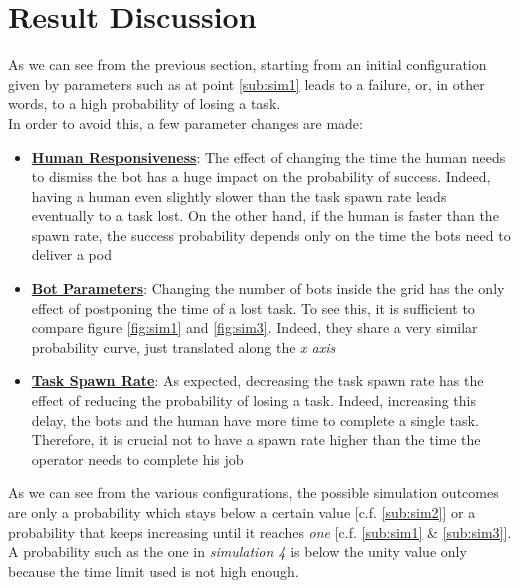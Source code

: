\documentclass{article}
\begin{document}
	\section{Result Discussion}
			As we can see from the previous section, starting from an initial configuration given by parameters such as at point \ref{sub:sim1} leads to a failure, or, in other words, to a high probability of losing a task.\\In order to avoid this, a few parameter changes are made:
			\begin{itemize}
				\item {\textbf{\underline{Human Responsiveness}}: The effect of changing the time the human needs to dismiss the bot has a huge impact on the probability of success. Indeed, having a human even slightly slower than the task spawn rate leads eventually to a task lost. On the other hand, if the human is faster than the spawn rate, the success probability depends only on the time the bots need to deliver a pod}
				\item {\textbf{\underline{Bot Parameters}}: Changing the number of bots inside the grid has the only effect of postponing the time of a lost task. To see this, it is sufficient to compare figure \ref{fig:sim1} and \ref{fig:sim3}. Indeed, they share a very similar probability curve, just translated along the \emph{x axis}}
				\item {\textbf{\underline{Task Spawn Rate}}:} As expected, decreasing the task spawn rate has the effect of reducing the probability of losing a task. Indeed, increasing this delay, the bots and the human have more time to complete a single task. Therefore, it is crucial not to have a spawn rate higher than the time the operator needs to complete his job
			\end{itemize}
			As we can see from the various configurations, the possible simulation outcomes are only a probability which stays below a certain value [c.f. \ref{sub:sim2}] or a probability that keeps increasing until it reaches \emph{one} [c.f. \ref{sub:sim1} \& \ref{sub:sim3}]. A probability such as the one in \emph{simulation 4} is below the unity value only because the time limit used is not high enough.
			
\end{document}
